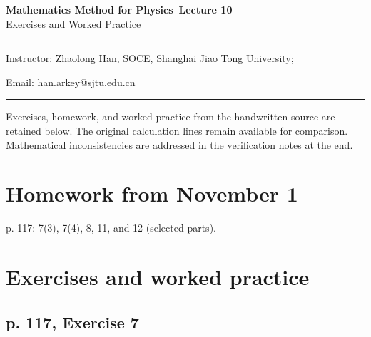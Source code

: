 \documentclass[11pt,a4paper]{article}
\theoremstyle{definition}
\theoremstyle{plain}
\begin{document}
\begin{center}
    {\LARGE \textbf{Mathematics Method for Physics--Lecture 10}} \\[0.6em]
    {\large Exercises and Worked Practice}
\end{center}

\vspace{-0.5em}
\noindent\rule{\textwidth}{0.5pt}
\vspace{0.3em}

\begin{center}
    Instructor: Zhaolong Han, SOCE, Shanghai Jiao Tong University;
\end{center}

\vspace{-0.6em}
\noindent Email: han.arkey@sjtu.edu.cn

\vspace{0.4em}
\noindent\rule{\textwidth}{0.5pt}

\vspace{0.8em}

\vspace{1.5em}


Exercises, homework, and worked practice from the handwritten source are retained below. The original calculation lines remain available for comparison. Mathematical inconsistencies are addressed in the verification notes at the end.

\section{Homework from November 1}

p. 117: 7(3), 7(4), 8, 11, and 12 (selected parts).


\section{Exercises and worked practice}

\subsection{p. 117, Exercise 7}
\end{document}
